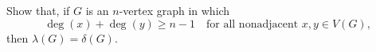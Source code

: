 \question Show that, if $G$ is an $n$-vertex graph in which 
\[
  \deg(x)+\deg(y) \geq n-1 \quad
  \text{for all nonadjacent $x, y \in V(G)$,} 
\]
then $\lambda(G)=\delta(G)$.
